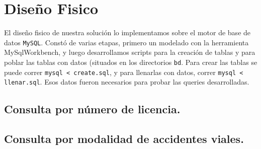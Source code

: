 \section{Diseño Fisico}

El diseño fisico de nuestra solución lo implementamos sobre el motor de base de datos \texttt{MySQL}.
Constó de varias etapas, primero un modelado con la
    herramienta MySqlWorkbench, y luego desarrollamos scripts para la creación de tablas
    y para poblar las tablas con datos (situados en los directorios \texttt{bd}.
Para crear las tablas se puede correr \texttt{mysql < create.sql}, y
    para llenarlas con datos, correr \texttt{mysql < llenar.sql}.
Esos datos fueron necesarios para probar las queries desarrolladas.

\subsection{Consulta por número de licencia.}



\subsection{Consulta por modalidad de accidentes viales.}


